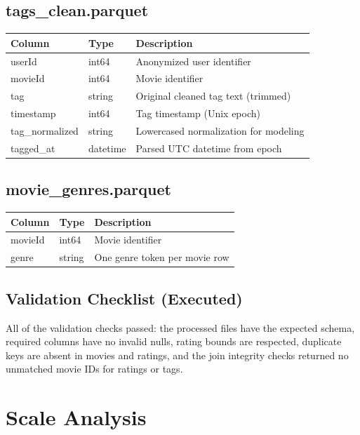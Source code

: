 \documentclass[11pt]{article}
\begin{document}
\subsection{tags\_clean.parquet}

\begin{longtable}{@{}p{}p{}p{}@{}}
\toprule
\textbf{Column} & \textbf{Type} & \textbf{Description} \\
\midrule
\endhead
userId & int64 & Anonymized user identifier \\
movieId & int64 & Movie identifier \\
tag & string & Original cleaned tag text (trimmed) \\
timestamp & int64 & Tag timestamp (Unix epoch) \\
tag\_normalized & string & Lowercased normalization for modeling \\
tagged\_at & datetime & Parsed UTC datetime from epoch \\
\bottomrule
\end{longtable}

\subsection{movie\_genres.parquet}

\begin{longtable}{@{}p{}p{}p{}@{}}
\toprule
\textbf{Column} & \textbf{Type} & \textbf{Description} \\
\midrule
\endhead
movieId & int64 & Movie identifier \\
genre & string & One genre token per movie row \\
\bottomrule
\end{longtable}

\subsection{Validation Checklist (Executed)}

All of the validation checks passed: the processed files have the expected schema, required columns have no invalid nulls, rating bounds are respected, duplicate keys are absent in movies and ratings, and the join integrity checks returned no unmatched movie IDs for ratings or tags.

\section{Scale Analysis}
\end{document}
